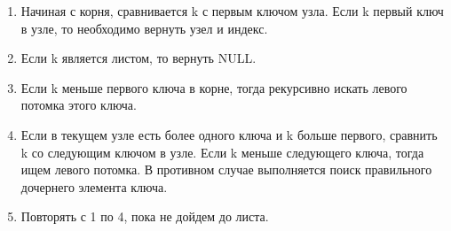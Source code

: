 \begin{enumerate}
    \item Начиная с корня, сравнивается k с первым ключом узла. Если k первый ключ в узле, то необходимо вернуть узел и индекс.
    \item Если k является листом, то вернуть NULL.
    \item Если k меньше первого ключа в корне, тогда рекурсивно искать левого потомка этого ключа.
    \item Если в текущем узле есть более одного ключа и k больше первого, сравнить k со следующим ключом в узле. Если k меньше следующего ключа, тогда ищем левого потомка. В противном случае выполняется поиск правильного дочернего элемента ключа. 
    \item Повторять с 1 по 4, пока не дойдем до листа.

\end{enumerate}
    
